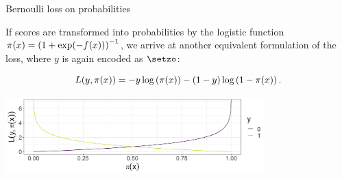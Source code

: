 \begin{vbframe}{Bernoulli loss on probabilities}

If scores are transformed into probabilities by the logistic function  $\pi(x) = \left(1 + \exp(- f(x))\right)^{-1}$, we arrive at another equivalent formulation of the loss, where $y$ is again encoded as $\setzo$:

  $$
    L(y, \pi(x)) = - y \log \left(\pi(x)\right) - (1 - y) \log \left(1 - \pi(x)\right). 
  $$
  
\lz

\begin{center}
\includegraphics[width = 10cm ]{figure/plot_bernoulli_prob.png}
\end{center}

\end{vbframe}



